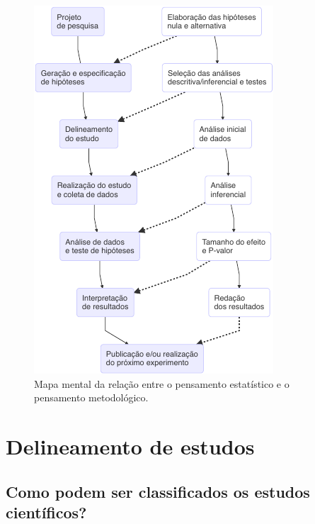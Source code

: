 \documentclass[
  a4paper,
]{book}
\begin{document}
\begin{figure}

{\centering \includegraphics{Ciencia-com-R_files/figure-latex/unnamed-chunk-5-1} 

}

\caption{Mapa mental da relação entre o pensamento estatístico e o pensamento metodológico.}\label{fig:unnamed-chunk-5}
\end{figure}

\hypertarget{delineamento-estudos}{%
\section{Delineamento de estudos}\label{delineamento-estudos}}

\hypertarget{como-podem-ser-classificados-os-estudos-cientuxedficos}{%
\subsection{Como podem ser classificados os estudos científicos?}\label{como-podem-ser-classificados-os-estudos-cientuxedficos}}
\end{document}
